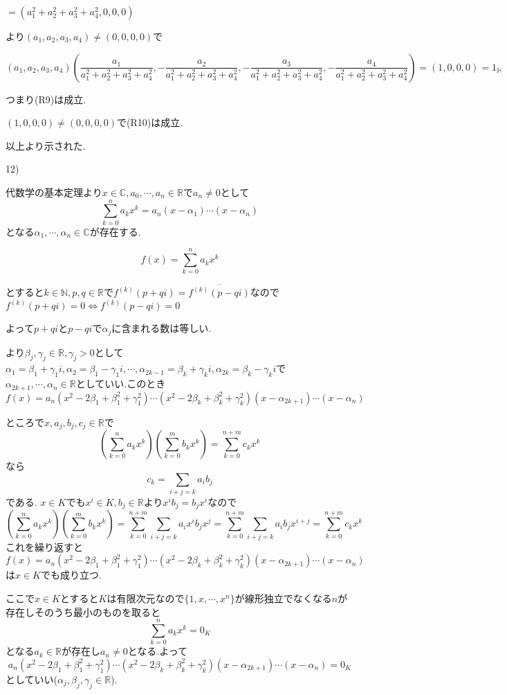 \documentclass{jsarticle}
\begin{document}
$=(a_1^2+a_2^2+a_3^2+a_4^2,0,0,0)$

より$(a_1,a_2,a_3,a_4)\neq (0,0,0,0)$で

\[(a_1,a_2,a_3,a_4)(\frac{a_1}{a_1^2+a_2^2+a_3^2+a_4^2},-\frac{a_2}{a_1^2+a_2^2+a_3^2+a_4^2},-\frac{a_3}{a_1^2+a_2^2+a_3^2+a_4^2},-\frac{a_4}{a_1^2+a_2^2+a_3^2+a_4^2})=(1,0,0,0)=1_\mathbb{H}\]

つまり(R9)は成立.

$(1,0,0,0)\neq (0,0,0,0)$で(R10)は成立.

以上より示された.

12)

代数学の基本定理より$x\in\mathbb{C},a_0,\cdots,a_n\in\mathbb{R}$で$a_n\neq 0$として
\[\sum_{k=0}^na_kx^k= a_n(x-\alpha_1)\cdots (x-\alpha_n)\]
となる$\alpha_1,\cdots ,\alpha_n\in\mathbb{C}$が存在する.

\[f(x)=\sum_{k=0}^na_kx^k\]

とすると$k\in\mathbb{N},p,q\in\mathbb{R}$で$f^{(k)}(p+qi)=\overline{f^{(k)}(p-qi)}$なので$f^{(k)}(p+qi)=0\Leftrightarrow f^{(k)}(p-qi)=0$

よって$p+qi$と$p-qi$で$\alpha_j$に含まれる数は等しい.

より$\beta_j,\gamma_j\in\mathbb{R},\gamma_j >0$として
$\alpha_1=\beta_1+\gamma_1i,\alpha_2=\beta_1-\gamma_1i,\cdots ,\alpha_{2k-1}=\beta_k+\gamma_ki,\alpha_{2k}=\beta_k-\gamma_ki$で$\alpha_{2k+1},\cdots,\alpha_{n} \in\mathbb{R}$としていい.このとき
\[f(x)=a_n(x^2-2\beta_1+\beta_1^2+\gamma_1^2)\cdots (x^2-2\beta_k+\beta_k^2+\gamma_k^2)(x-\alpha_{2k+1})\cdots (x-\alpha_n)\]

ところで$x,a_j,b_j,c_j\in\mathbb{R}$で
\[(\sum_{k=0}^n a_kx^k)(\sum_{k=0}^m b_kx^k)=\sum_{k=0}^{n+m} c_kx^k\]
なら
\[c_k = \sum_{i+j=k}a_ib_j\]である.
$x\in K$でも$x^i\in K,b_j\in\mathbb{R}$より$x^ib_j=b_jx^i$なので
\[(\sum_{k=0}^n a_kx^k)(\sum_{k=0}^m b_kx^k)=\sum_{k=0}^{n+m}\sum_{i+j=k}a_ix^ib_jx^j=\sum_{k=0}^{n+m}\sum_{i+j=k}a_ib_jx^{i+j}=\sum_{k=0}^{n+m}c_kx^{k}\]
これを繰り返すと
\[f(x)=a_n(x^2-2\beta_1+\beta_1^2+\gamma_1^2)\cdots (x^2-2\beta_k+\beta_k^2+\gamma_k^2)(x-\alpha_{2k+1})\cdots (x-\alpha_n)\]
は$x\in K$でも成り立つ.

ここで$x\in K$とすると$K$は有限次元なので$\{1,x,\cdots,x^n\}$が線形独立でなくなる$n$が存在しそのうち最小のものを取ると
\[\sum_{k=0}^na_kx^k = 0_K\]
となる$a_k\in\mathbb{R}$が存在し$a_n\neq 0$となる.よって
\[a_n(x^2-2\beta_1+\beta_1^2+\gamma_1^2)\cdots (x^2-2\beta_k+\beta_k^2+\gamma_k^2)(x-\alpha_{2k+1})\cdots (x-\alpha_n)=0_K\]
としていい($\alpha_j,\beta_j,\gamma_j\in\mathbb{R}$).
\end{document}
